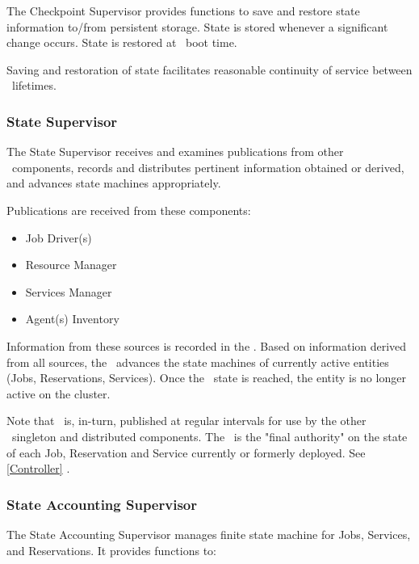 \begin{itemize}
    The Checkpoint Supervisor provides functions to save and restore state information
    to/from persistent storage. State is stored whenever a significant change occurs.
    State is restored at \varOrchestrator~boot time.
    
    Saving and restoration of state facilitates reasonable continuity of service
    between \varOrchestrator~lifetimes.
    
    \subsubsection{State Supervisor} 

    The State Supervisor receives and examines publications from other
    \varDUCC~components, records and distributes pertinent information obtained
    or derived, and advances state machines appropriately.
    
    Publications are received from these components:
    
    \begin{itemize}
    
    \item Job Driver(s)
    \item Resource Manager
    \item Services Manager
    \item Agent(s) Inventory
      
    \end{itemize} 
    
    Information from these sources is recorded in the \varORmap. 
    Based on information derived from all sources, the 
    \varOrchestrator~advances the state machines of currently active 
    entities (Jobs, Reservations, Services). 
    Once the \varCompleted~state is reached, the
    entity is no longer active on the cluster.
    
    Note that \varORmap~is, in-turn, published at regular intervals 
    for use by the other \varDUCC~singleton and distributed components.
    The \varORmap~is the "final authority" on the state of
    each Job, Reservation and Service currently or formerly deployed.
    See \ref{Controller} \varController.
    
    \subsubsection{State Accounting Supervisor} 
        
    The State Accounting Supervisor manages finite state machine for 
    Jobs, Services, and Reservations. It provides functions to:
    

\end{itemize}

